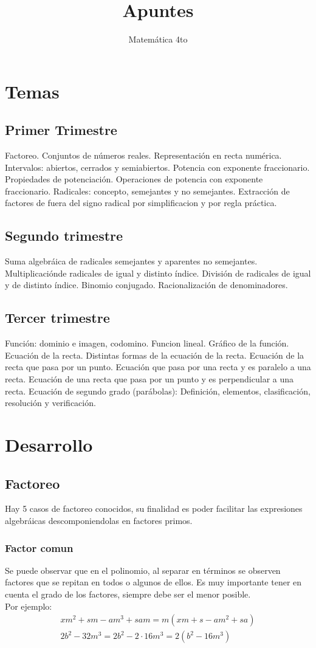 \documentclass[a4paper]{article}
\title{Apuntes}
\author{Matemática 4to}
\begin{document}
\maketitle
\section{Temas}
\subsection{Primer Trimestre}
Factoreo. Conjuntos de números reales. Representación en recta numérica. Intervalos: abiertos, cerrados y semiabiertos. Potencia con exponente fraccionario. Propiedades de potenciación. Operaciones de potencia con exponente fraccionario. Radicales: concepto, semejantes y no semejantes. Extracción de factores de fuera del signo radical por simplificacion y por regla práctica.
\subsection{Segundo trimestre}
Suma algebráica de radicales semejantes y aparentes no semejantes. Multiplicaciónde radicales de igual y distinto índice. División de radicales de igual y de distinto índice. Binomio conjugado. Racionalización de denominadores.
\subsection{Tercer trimestre}
Función: dominio e imagen, codomino. Funcion lineal. Gráfico de la función. Ecuación de la recta. Distintas formas de la ecuación de la recta. Ecuación de la recta que pasa por un punto. Ecuación que pasa por una recta y es paralelo a una recta. Ecuación de una recta que pasa por un punto y es perpendicular a una recta. Ecuación de segundo grado (parábolas): Definición, elementos, clasificación, resolución y verificación.

\section{Desarrollo}
\subsection{Factoreo}
Hay 5 casos de factoreo conocidos, su finalidad es poder facilitar las expresiones algebráicas descomponiendolas en factores primos.
\subsubsection{Factor comun}
Se puede observar que en el polinomio, al separar en términos se observen factores que se repitan en todos o algunos de ellos. Es muy importante tener en cuenta el grado de los factores, siempre debe ser el menor posible.\\
Por ejemplo:
\begin{gather*}
    xm^2 + sm - am^3 + sam = m(xm+s-am^2+sa)\\
    2b^2-32m^3=2b^2-2\cdot 16m^3=2(b^2-16m^3)
\end{gather*}
\end{document}
